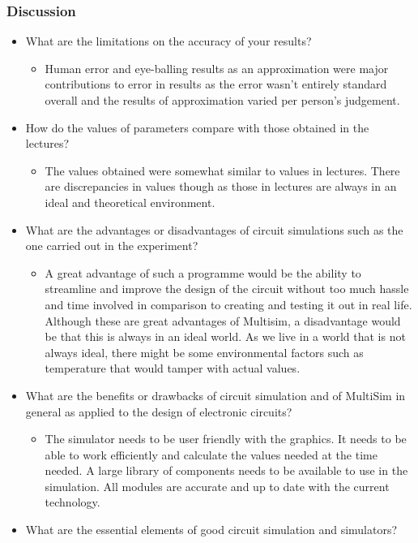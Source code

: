 \documentclass[12pt]{article}
\begin{document}
\subsubsection{Discussion}
\begin{itemize}
\item What are the limitations on the accuracy of your results?
\begin{itemize}
\item Human error and eye-balling results as an approximation were major contributions to error in results as the error wasn’t entirely standard overall and the results of approximation varied per person’s
judgement.
\end{itemize}
\item How do the values of parameters compare with those obtained in the lectures?
\begin{itemize}
\item The values obtained were somewhat similar to values in lectures. There are discrepancies in values though as those in lectures are always in an ideal and theoretical environment.
\end{itemize}
\item What are the advantages or disadvantages of circuit simulations such as the one carried out in the experiment?
\begin{itemize}
\item A great advantage of such a programme would be the ability to streamline and improve the design of the circuit without too much hassle and time involved in comparison to creating and testing it out
in real life. Although these are great advantages of Multisim, a disadvantage would be that this is always in an ideal world. As we live in a world that is not always ideal, there might be some environmental factors such as temperature that would tamper with actual values.
\end{itemize}
\item What are the benefits or drawbacks of circuit simulation and of MultiSim in general as applied to the design of electronic circuits?
\begin{itemize}
\item The simulator needs to be user friendly with the graphics. It needs to be able to work efficiently and calculate the values needed at the time needed. A large library of components needs to be available to use in the simulation. All modules are accurate and up to date with the current technology. 
\end{itemize}
\item What are the essential elements of good circuit simulation and simulators?

\end{itemize}
\end{document}
